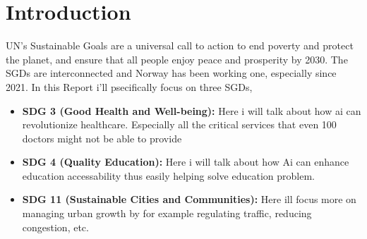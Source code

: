 \chapter{Introduction}
UN's Sustainable Goals are a universal call to action to end poverty and protect the planet, and ensure that all people enjoy peace and prosperity by 2030.\cite{fns-baerekraftsmaal} The SGDs are interconnected and Norway has been working one, especially since 2021.\cite{fns-baerekraftsmaal-plan-norge} In this Report i'll psecifically focus on three SGDs, \\
 

\begin{itemize}
    \item \textbf{SDG 3 (Good Health and Well-being):} Here i will talk about how ai can revolutionize healthcare. Especially all the critical services that even 100 doctors might not be able to provide
    \item \textbf{SDG 4 (Quality Education):} Here i will talk about how Ai can enhance education accessability thus easily helping solve education problem.
    \item \textbf{SDG 11 (Sustainable Cities and Communities):} Here ill focus more on managing urban growth by for example regulating traffic, reducing congestion, etc.
\end{itemize}